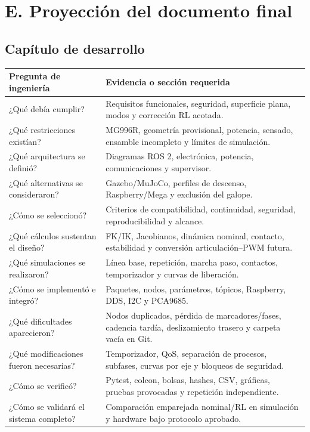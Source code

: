 \documentclass[11pt,letterpaper]{article}
\begin{document}
\section{E. Proyección del documento final}

\subsection{Capítulo de desarrollo}

\begin{longtable}{p{6.2cm}p{9.2cm}}
\toprule
\textbf{Pregunta de ingeniería} & \textbf{Evidencia o sección requerida}\\
\midrule
¿Qué debía cumplir? & Requisitos funcionales, seguridad, superficie plana, modos y corrección RL acotada.\\
¿Qué restricciones existían? & MG996R, geometría provisional, potencia, sensado, ensamble incompleto y límites de simulación.\\
¿Qué arquitectura se definió? & Diagramas ROS 2, electrónica, potencia, comunicaciones y supervisor.\\
¿Qué alternativas se consideraron? & Gazebo/MuJoCo, perfiles de descenso, Raspberry/Mega y exclusión del galope.\\
¿Cómo se seleccionó? & Criterios de compatibilidad, continuidad, seguridad, reproducibilidad y alcance.\\
¿Qué cálculos sustentan el diseño? & FK/IK, Jacobianos, dinámica nominal, contacto, estabilidad y conversión articulación--PWM futura.\\
¿Qué simulaciones se realizaron? & Línea base, repetición, marcha paso, contactos, temporizador y curvas de liberación.\\
¿Cómo se implementó e integró? & Paquetes, nodos, parámetros, tópicos, Raspberry, DDS, I2C y PCA9685.\\
¿Qué dificultades aparecieron? & Nodos duplicados, pérdida de marcadores/fases, cadencia tardía, deslizamiento trasero y carpeta vacía en Git.\\
¿Qué modificaciones fueron necesarias? & Temporizador, QoS, separación de procesos, subfases, curvas por eje y bloqueos de seguridad.\\
¿Cómo se verificó? & Pytest, colcon, bolsas, hashes, CSV, gráficas, pruebas provocadas y repetición independiente.\\
¿Cómo se validará el sistema completo? & Comparación emparejada nominal/RL en simulación y hardware bajo protocolo aprobado.\\
\bottomrule
\end{longtable}
\end{document}
